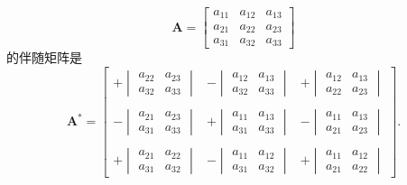 \begin{example}
	\[
		\mathbf{A} = \begin{bmatrix}
			a_{11} & a_{12} & a_{13} \\
			a_{21} & a_{22} & a_{23} \\
			a_{31} & a_{32} & a_{33}
		\end{bmatrix}
	\]的伴随矩阵是
	\[
		\mathbf{A}^{\ast} = \begin{bmatrix}
			+\begin{vmatrix} a_{22} & a_{23} \\ a_{32} & a_{33} \end{vmatrix} &
			-\begin{vmatrix} a_{12} & a_{13} \\ a_{32} & a_{33} \end{vmatrix} &
			+\begin{vmatrix} a_{12} & a_{13} \\ a_{22} & a_{23} \end{vmatrix}       \\
			                                                                  &   & \\
			-\begin{vmatrix} a_{21} & a_{23} \\ a_{31} & a_{33} \end{vmatrix} &
			+\begin{vmatrix} a_{11} & a_{13} \\ a_{31} & a_{33} \end{vmatrix} &
			-\begin{vmatrix} a_{11} & a_{13} \\ a_{21} & a_{23} \end{vmatrix}       \\
			                                                                  &   & \\
			+\begin{vmatrix} a_{21} & a_{22} \\ a_{31} & a_{32} \end{vmatrix} &
			-\begin{vmatrix} a_{11} & a_{12} \\ a_{31} & a_{32} \end{vmatrix} &
			+\begin{vmatrix} a_{11} & a_{12} \\ a_{21} & a_{22} \end{vmatrix}
		\end{bmatrix}.
	\]
\end{example}

